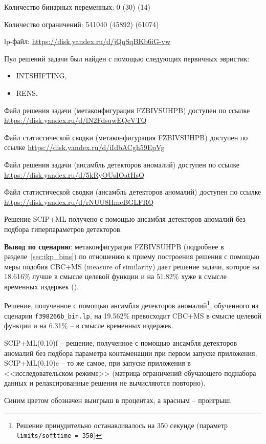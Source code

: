 \documentclass[%
	11pt,
	a4paper,
	utf8,
		]{article}
\begin{document}
Количество бинарных переменных: 0 (30) (14)

Количество ограничений: 541040 (45892) (61074)

lp-файл: \url{https://disk.yandex.ru/d/jQqSqBKb6iG-vw}

Пул решений задачи был найден с помощью следующих первичных эвристик:
\begin{itemize}
	\item INTSHIFTING,
	
	\item RENS.
\end{itemize}

Файл решения задачи (метаконфигурация FZBIVSUHPB) доступен по ссылке \url{https://disk.yandex.ru/d/lN2FdsqwEQcVTQ}

Файл статистической сводки (метаконфигурация FZBIVSUHPB) доступен по ссылке \url{https://disk.yandex.ru/d/iIdbACgh59EpVg}

Файл решения задачи (ансамбль детекторов аномалий) доступен по ссылке \url{https://disk.yandex.ru/d/5kRyOUsIOatHsQ}

Файл статистической сводки (ансамбль детекторов аномалий) доступен по ссылке \url{https://disk.yandex.ru/d/rNUU8HmeBGLFRQ}

Решение SCIP+ML получено с помощью ансамбля детекторов аномалий без подбора гиперпараметров детекторов.

\vspace*{3mm}
\textbf{Вывод по сценарию}: метаконфигурация FZBIVSUHPB (подробнее в разделе~\ref{sec:ikp_bins}) по отношению к приему построения решения с помощью меры подобия CBC+MS (measure of similarity) дает решение задачи, которое на 18.616\% лучше в смысле целевой функции и на  51.82\% хуже в смысле временных издержек ().

Решение, полученное с помощью ансамбля детекторов аномалий\footnote{Решение принудительно останавливалось на 350 секунде (параметр \texttt{limits/softtime = 350})}, обученного на сценарии \texttt{f398266b\_bin.lp}, на 19.562\% превосходит CBC+MS в смысле целевой функции и на 6.31\% -- в смысле временных издержек.

SCIP+ML(0.10)f -- решение, полученное с помощью ансамбля детекторов аномалий без подбора параметра контаменации при первом запуске приложения, SCIP+ML(0.10)e -- то же самое, при запуске приложения в <<исследовательском режиме>> (матрица ограничений обучающего поднабора данных и релаксированные решения не вычисляются повторно).

Синим цветом обозначен выигрыш в процентах, а красным -- проигрыш.
\end{document}
